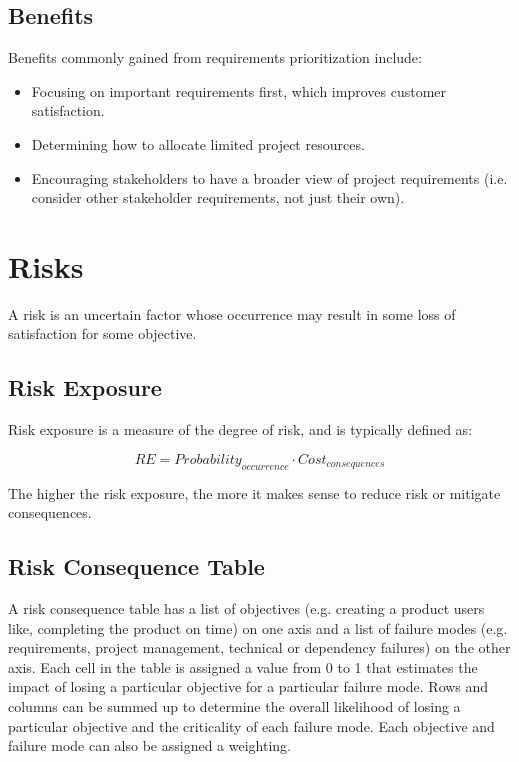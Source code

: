 \documentclass[12pt,titlepage]{article}
\let\stdsection\section
\renewcommand\section{\clearpage\stdsection}
\begin{document}
    \subsection{Benefits}
      Benefits commonly gained from requirements prioritization include:
      \begin{itemize}
        \item Focusing on important requirements first, which improves customer satisfaction.
        \item Determining how to allocate limited project resources.
        \item Encouraging stakeholders to have a broader view of project requirements (i.e. consider other stakeholder requirements, not just their own).
      \end{itemize}

  \section{Risks}
    A risk is an uncertain factor whose occurrence may result in some loss of satisfaction for some objective.

    \subsection{Risk Exposure}
      Risk exposure is a measure of the degree of risk, and is typically defined as:

      $$RE = Probability_{occurrence} \cdot Cost_{consequences}$$

      The higher the risk exposure, the more it makes sense to reduce risk or mitigate consequences.

    \subsection{Risk Consequence Table}
      A risk consequence table has a list of objectives (e.g. creating a product users like, completing the product on time) on one axis
      and a list of failure modes (e.g. requirements, project management, technical or dependency failures) on the other axis. Each cell in the
      table is assigned a value from 0 to 1 that estimates the impact of losing a particular objective for a particular failure mode. Rows and
      columns can be summed up to determine the overall likelihood of losing a particular objective and the criticality of each failure mode. Each
      objective and failure mode can also be assigned a weighting.
\end{document}
